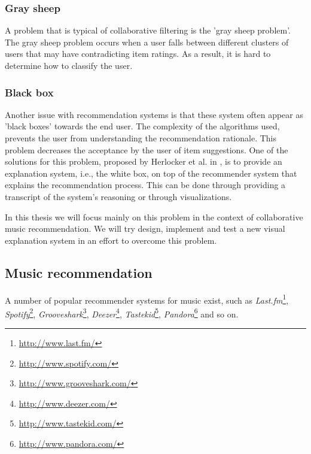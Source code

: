 \subsubsection{Gray sheep}

A problem that is typical of collaborative filtering is the 'gray sheep problem'\cite{burke:2002, herlocker:2000}. The gray sheep problem occurs when a user falls between different clusters of users that may have contradicting item ratings. As a result, it is hard to determine how to classify the user\cite{burke:2002}.


\subsubsection{Black box}

Another issue with recommendation systems is that these system often appear as 'black boxes' towards the end user. The complexity of the algorithms used, prevents the user from understanding the recommendation rationale\cite{zhao:2010}. This problem decreases the acceptance by the user of item suggestions. One of the solutions for this problem, proposed by Herlocker et al. in \cite{herlocker:2000}, is to provide an explanation system, i.e., the white box, on top of the recommender system that explains the recommendation process. This can be done through providing a transcript of the system's reasoning or through visualizations\cite{herlocker:2000}.

In this thesis we will focus mainly on this problem in the context of collaborative music recommendation. We will try design, implement and test a new visual explanation system in an effort to overcome this problem.


\subsection{Music recommendation}\label{chapter:literature_study:section:computer:subsection:music}


A number of popular recommender systems for music exist, such as \emph{Last.fm}\footnote{\url{http://www.last.fm/}}, \emph{Spotify}\footnote{\url{http://www.spotify.com/}}, \emph{Grooveshark}\footnote{\url{http://www.grooveshark.com/}}, \emph{Deezer}\footnote{\url{http://www.deezer.com/}}, \emph{Tastekid}\footnote{\url{http://www.tastekid.com/}}, \emph{Pandora}\footnote{\url{http://www.pandora.com/}} and so on.





